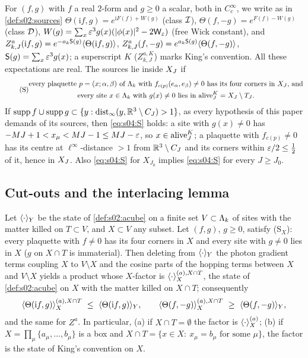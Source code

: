 For $(f,g)$ with $f$ a real $2$-form and $g\ge0$ a scalar, both in $C^\infty_c$, we write as in \cref{def:s02:sources} $\Theta(\mathrm if,g)=e^{\mathrm iF(f)+W(g)}$ (class $\mathcal I$), $\Theta(f,-g)=e^{F(f)-W(g)}$ (class $\mathcal D$), $W(g)=\sum_x\varepsilon^3g(x)(|\phi(x)|^2-2\mathsf W_{\varepsilon})$ (free Wick constant), and $Z^a_{k,J}(\mathrm if,g)=e^{-a_k\mathsf S(g)}\langle \Theta(\mathrm if,g)\rangle$, $Z^a_{k,J}(f,-g)=e^{a_k\mathsf S(g)}\langle \Theta(f,-g)\rangle$, $\mathsf S(g)=\sum_x\varepsilon^3g(x)$; a superscript $K$ ($Z^{a,K}_{k,J}$) marks King's convention. All these expectations are real. The sources lie inside $X_J$ if
\begin{equation}\label{eq:s04:S}\tag{S}
\begin{gathered}
\text{every plaquette $p=(x;\alpha,\beta)$ of $\Lambda_k$ with $f_{c(p)}(e_\alpha,e_\beta)\ne0$ has its four corners in $X_J$, and}\\
\text{every site $x\in\Lambda_k$ with $g(x)\ne0$ lies in $\operatorname{alive}^K_J=X_J\setminus T_J$.}
\end{gathered}
\end{equation}
If $\operatorname{supp} f\cup\operatorname{supp} g\subset\{y:\operatorname{dist}_\infty(y,\mathbb R^3\setminus C_J)>1\}$, as every hypothesis of this paper demands of its sources, then \eqref{eq:s04:S} holds: a site with $g(x)\ne0$ has $-MJ+1<x_\mu<MJ-1\le MJ-\varepsilon$, so $x\in\operatorname{alive}^K_J$; a plaquette with $f_{c(p)}\ne0$ has its centre at $\ell^\infty$-distance $>1$ from $\mathbb R^3\setminus C_J$ and its corners within $\varepsilon/2\le\frac12$ of it, hence in $X_J$. Also \eqref{eq:s04:S} for $X_{J_0}$ implies \eqref{eq:s04:S} for every $J\ge J_0$.

\subsection{Cut-outs and the interlacing lemma}

\begin{lemma}\label{lem:s04:G3}
Let $\langle \cdot\rangle_Y$ be the state of \cref{def:s02:acube} on a finite set $V\subset\Lambda_k$ of sites with the matter killed on $T\subset V$, and $X\subset V$ any subset. Let $(f,g)$, $g\ge0$, satisfy \textup{(S$_X$)}: every plaquette with $f\ne0$ has its four corners in $X$ and every site with $g\ne0$ lies in $X$ ($g$ on $X\cap T$ is immaterial). Then deleting from $\langle \cdot\rangle_Y$ the photon gradient terms coupling $X$ to $V\setminus X$ and the cosine parts of the hopping terms between $X$ and $V\setminus X$ yields a product whose $X$-factor is $\langle \cdot\rangle^{(a),X\cap T}_X$, the state of \cref{def:s02:acube} on $X$ with the matter killed on $X\cap T$; consequently
\[
\langle \Theta(\mathrm if,g)\rangle^{(a),X\cap T}_X\ \le\ \langle \Theta(\mathrm if,g)\rangle_Y,\qquad
\langle \Theta(f,-g)\rangle^{(a),X\cap T}_X\ \ge\ \langle \Theta(f,-g)\rangle_Y,
\]
and the same for $Z^a$. In particular, \textup{(a)} if $X\cap T=\emptyset$ the factor is $\langle \cdot\rangle^{(a)}_X$; \textup{(b)} if $X=\prod_\mu\{a_\mu,\dots,b_\mu\}$ is a box and $X\cap T=\{x\in X:\ x_\mu=b_\mu\text{ for some }\mu\}$, the factor is the state of King's convention on $X$.
\end{lemma}

